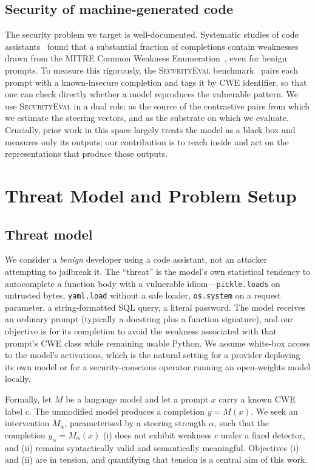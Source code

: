 \documentclass[11pt,a4paper]{article}
\begin{document}
\subsection{Security of machine-generated code}
The security problem we target is well-documented. Systematic studies of code assistants~\cite{pearce2022asleep} found that a substantial fraction of completions contain weaknesses drawn from the MITRE Common Weakness Enumeration~\cite{mitre_cwe}, even for benign prompts. To measure this rigorously, the \textsc{SecurityEval} benchmark~\cite{siddiq2022securityeval} pairs each prompt with a known-insecure completion and tags it by CWE identifier, so that one can check directly whether a model reproduces the vulnerable pattern. We use \textsc{SecurityEval} in a dual role: as the source of the contrastive pairs from which we estimate the steering vectors, and as the substrate on which we evaluate. Crucially, prior work in this space largely treats the model as a black box and measures only its outputs; our contribution is to reach inside and act on the representations that produce those outputs.

\section{Threat Model and Problem Setup}
\label{sec:setup}

\subsection{Threat model}
We consider a \emph{benign} developer using a code assistant, not an attacker attempting to jailbreak it. The ``threat'' is the model's own statistical tendency to autocomplete a function body with a vulnerable idiom---\texttt{pickle.loads} on untrusted bytes, \texttt{yaml.load} without a safe loader, \texttt{os.system} on a request parameter, a string-formatted SQL query, a literal password. The model receives an ordinary prompt (typically a docstring plus a function signature), and our objective is for its completion to avoid the weakness associated with that prompt's CWE class while remaining usable Python. We assume white-box access to the model's activations, which is the natural setting for a provider deploying its own model or for a security-conscious operator running an open-weights model locally.

Formally, let $M$ be a language model and let a prompt $x$ carry a known CWE label $c$. The unmodified model produces a completion $y = M(x)$. We seek an intervention $M_\alpha$, parameterised by a steering strength $\alpha$, such that the completion $y_\alpha = M_\alpha(x)$ (i) does not exhibit weakness $c$ under a fixed detector, and (ii) remains syntactically valid and semantically meaningful. Objectives (i) and (ii) are in tension, and quantifying that tension is a central aim of this work.
\end{document}
